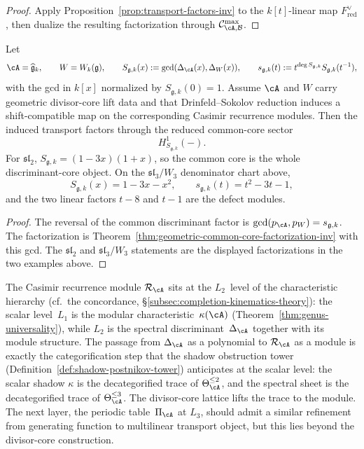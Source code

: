 \begin{proof}
Apply Proposition~\ref{prop:transport-factors-inv} to the
$k[t]$-linear map $F^\vee_{\mathrm{red}}$, then dualize the resulting
factorization through $\mathcal C^{\max}_{\cA,\mathcal B}$.
\end{proof}

\begin{theorem}
\label{thm:geometric-ds-common-core-inv}
Let
\[
\cA=\widehat{\mathfrak g}_k,\qquad
W=W_k(\mathfrak g),\qquad
S_{\mathfrak g,k}(x):=\gcd(\Delta_\cA(x),\Delta_W(x)),
\qquad
s_{\mathfrak g,k}(t):=
t^{\deg S_{\mathfrak g,k}}S_{\mathfrak g,k}(t^{-1}),
\]
with the gcd in $k[x]$ normalized by $S_{\mathfrak g,k}(0)=1$.
Assume $\cA$ and $W$ carry geometric divisor-core lift data and that
Drinfeld--Sokolov reduction induces a shift-compatible map on the
corresponding Casimir recurrence modules. Then the induced transport
factors through the reduced common-core sector
\[
H^1_{S_{\mathfrak g,k}}(-).
\]
For $\mathfrak{sl}_2$,
$S_{\mathfrak g,k}=(1-3x)(1+x)$, so the common core is the whole
discriminant-core object. On the $\mathfrak{sl}_3/W_3$ denominator
chart above,
\[
S_{\mathfrak g,k}(x)=1-3x-x^2,\qquad
s_{\mathfrak g,k}(t)=t^2-3t-1,
\]
and the two linear factors $t-8$ and $t-1$ are the defect modules.
\end{theorem}

\begin{proof}
The reversal of the common discriminant factor is
$\gcd(p_\cA,p_W)=s_{\mathfrak g,k}$. The factorization is
Theorem~\ref{thm:geometric-common-core-factorization-inv} with this
gcd. The $\mathfrak{sl}_2$ and $\mathfrak{sl}_3/W_3$ statements are
the displayed factorizations in the two examples above.
\end{proof}

\begin{remark}
\label{rem:casimir-position}
The Casimir recurrence module $\mathcal{R}_\cA$ sits at the
$L_2$~level of the characteristic hierarchy
(cf.~the concordance, \S\ref{subsec:completion-kinematics-theory}): the
scalar level~$L_1$ is the modular
characteristic~$\kappa(\cA)$
(Theorem~\ref{thm:genus-universality}), while $L_2$ is the
spectral discriminant~$\Delta_\cA$ together with its module
structure. The passage from $\Delta_\cA$ as a polynomial to
$\mathcal{R}_\cA$ as a module is exactly the categorification
step that the shadow obstruction tower
(Definition~\ref{def:shadow-postnikov-tower}) anticipates at
the scalar level: the scalar shadow $\kappa$ is the decategorified
trace of $\Theta_\cA^{\leq 2}$, and the spectral sheet is the
decategorified trace of $\Theta_\cA^{\leq 3}$. The divisor-core
lattice lifts the trace to the module. The next layer, the
periodic table~$\Pi_\cA$ at $L_3$, should admit a similar
refinement from generating function to multilinear transport
object, but this lies beyond the divisor-core construction.
\end{remark}

